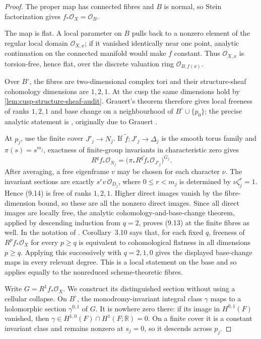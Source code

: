 \begin{proof}
The proper map has connected fibres and \(B\) is normal, so Stein
factorization gives \(f_*\mathcal O_X=\mathcal O_B\).

The map is flat.  A local parameter on \(B\) pulls back to a nonzero
element of the regular local domain \(\mathcal O_{X,x}\); if it vanished
identically near one point, analytic continuation on the connected
manifold would make \(f\) constant.  Thus \(\mathcal O_{X,x}\) is
torsion-free, hence flat, over the discrete valuation ring
\(\mathcal O_{B,f(x)}\).

Over \(B^\circ\), the fibres are two-dimensional complex tori and their
structure-sheaf cohomology dimensions are \(1,2,1\).  At the cusp the same
dimensions hold by \cref{lem:cusp-structure-sheaf-audit}.  Grauert's
theorem therefore gives local freeness of ranks \(1,2,1\) and base change
on a neighbourhood of \(B^\circ\cup\{p_0\}\); the precise analytic statement is
\cite[Chapter~III, \S4, Theorem~4.12]{BanicaStanasila1976}, originally due to
Grauert \cite{Grauert1960}.

At \(p_j\), use the finite cover \(J'_j\to N_j\).  If
\(\widetilde f:J'_j\to\Delta_j\) is the smooth torus family and
\(\pi(s)=s^{m_j}\), exactness of finite-group invariants in characteristic
zero gives
\[
 R^qf_*\mathcal O_{N_j}
 =\bigl(\pi_*R^q\widetilde f_*\mathcal O_{J'_j}\bigr)^{G_j}.
\tag{9.14}
\]
After averaging, a free eigenframe \(v\) may be chosen for each character
\(\nu\).  The invariant sections are exactly
\(s^rv\,\mathcal O_{D_j}\), where \(0\le r<m_j\) is determined by
\(\nu\zeta_j^r=1\).  Hence (9.14) is free of ranks \(1,2,1\).
Higher direct images vanish by the fibre-dimension bound, so these are all
the nonzero direct images.  Since all direct images are locally free, the analytic
cohomology-and-base-change theorem, applied by descending induction from
\(q=2\), proves (9.13) at the finite fibres as well.  In the notation of
\cite[Chapter~III, \S3, Theorem~3.4, Corollaries~3.5, 3.7, and 3.10]
  {BanicaStanasila1976}.  Corollary~3.10 says that, for each fixed \(q\),
  freeness of \(R^p f_*\mathcal O_X\) for every \(p\ge q\) is equivalent to
  cohomological flatness in all dimensions \(p\ge q\).  Applying this
  successively with \(q=2,1,0\) gives the displayed base-change maps in every
  relevant degree.  This is a local statement on the base and so applies
  equally to the nonreduced scheme-theoretic fibres.

Write \(G=R^1f_*\mathcal O_X\).  We construct its distinguished section
without using a cellular collapse.  On \(B^\circ\), the monodromy-invariant
integral class \(\gamma\) maps to a holomorphic section
\(\gamma^{0,1}\) of \(G\).  It is nowhere zero there: if its image in
\(H^{0,1}(F)\) vanished, then
\(\gamma\in H^{1,0}(F)\cap H^1(F;\mathbb R)=0\).  On a finite cover it is
a constant invariant class and remains nonzero at \(s_j=0\), so it
descends across \(p_j\).


\end{proof}
